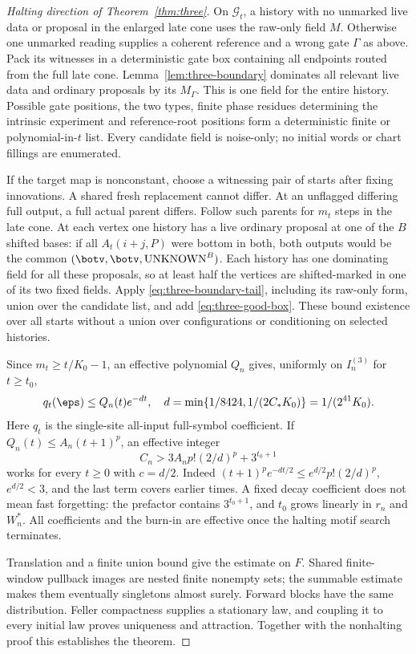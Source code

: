 \begin{proof}[Halting direction of Theorem~\ref{thm:three}]
On $\mathcal G_t$, a history with no unmarked live data or proposal in the enlarged late cone uses the raw-only field $M$. Otherwise one unmarked reading supplies a coherent reference and a wrong gate $\Gamma$ as above. Pack its witnesses in a deterministic gate box containing all endpoints routed from the full late cone. Lemma~\ref{lem:three-boundary} dominates all relevant live data and ordinary proposals by its $M_\Gamma$. This is one field for the entire history. Possible gate positions, the two types, finite phase residues determining the intrinsic experiment and reference-root positions form a deterministic finite or polynomial-in-$t$ list. Every candidate field is noise-only; no initial words or chart fillings are enumerated.

If the target map is nonconstant, choose a witnessing pair of starts after fixing innovations. A shared fresh replacement cannot differ. At an unflagged differing full output, a full actual parent differs. Follow such parents for $m_t$ steps in the late cone. At each vertex one history has a live ordinary proposal at one of the $B$ shifted bases: if all $A_t(i+j,P)$ were bottom in both, both outputs would be the common $(\botv,\botv,\mathrm{UNKNOWN}^B)$. Each history has one dominating field for all these proposals, so at least half the vertices are shifted-marked in one of its two fixed fields. Apply \eqref{eq:three-boundary-tail}, including its raw-only form, union over the candidate list, and add \eqref{eq:three-good-box}. These bound existence over all starts without a union over configurations or conditioning on selected histories.

Since $m_t\ge t/K_0-1$, an effective polynomial $Q_n$ gives, uniformly on $I_n^{(3)}$ for $t\ge t_0$,
\[
 q_t(\eps)\le Q_n(t)e^{-dt},\quad
 d=\min\{1/8424,1/(2C_*K_0)\}=1/(2^{41}K_0).
\]
Here $q_t$ is the single-site all-input full-symbol coefficient. If $Q_n(t)\le A_n(t+1)^p$, an effective integer
\[
 C_n>3A_np!(2/d)^p+3^{t_0+1}
\]
works for every $t\ge0$ with $c=d/2$. Indeed $(t+1)^pe^{-dt/2}\le e^{d/2}p!(2/d)^p$, $e^{d/2}<3$, and the last term covers earlier times. A fixed decay coefficient does not mean fast forgetting: the prefactor contains $3^{t_0+1}$, and $t_0$ grows linearly in $r_n$ and $W_n^*$. All coefficients and the burn-in are effective once the halting motif search terminates.

Translation and a finite union bound give the estimate on $F$. Shared finite-window pullback images are nested finite nonempty sets; the summable estimate makes them eventually singletons almost surely. Forward blocks have the same distribution. Feller compactness supplies a stationary law, and coupling it to every initial law proves uniqueness and attraction. Together with the nonhalting proof this establishes the theorem.
\end{proof}

